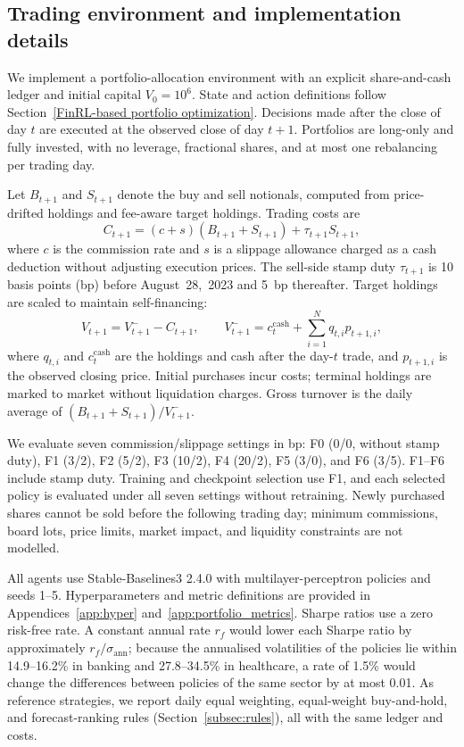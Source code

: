 \subsection{Trading environment and implementation details}
\label{subsec:env}
{\color{blue}
We implement a portfolio-allocation environment with an explicit share-and-cash ledger and initial capital $V_0=10^6$. State and action definitions follow Section~\ref{FinRL-based portfolio optimization}. Decisions made after the close of day $t$ are executed at the observed close of day $t+1$. Portfolios are long-only and fully invested, with no leverage, fractional shares, and at most one rebalancing per trading day.

Let $B_{t+1}$ and $S_{t+1}$ denote the buy and sell notionals, computed from price-drifted holdings and fee-aware target holdings. Trading costs are
\begin{equation}
C_{t+1}=(c+s)(B_{t+1}+S_{t+1})+\tau_{t+1}S_{t+1},
\label{eq:trading_cost}
\end{equation}
where $c$ is the commission rate and $s$ is a slippage allowance charged as a cash deduction without adjusting execution prices. The sell-side stamp duty $\tau_{t+1}$ is 10 basis points (bp) before August~28,~2023 and 5~bp thereafter. Target holdings are scaled to maintain self-financing:
\begin{equation}
V_{t+1}=V^{-}_{t+1}-C_{t+1},
\qquad
V^{-}_{t+1}=c^{\mathrm{cash}}_t+\sum_{i=1}^{N}q_{t,i}p_{t+1,i},
\label{eq:portfolio_value_update}
\end{equation}
where $q_{t,i}$ and $c^{\mathrm{cash}}_t$ are the holdings and cash after the day-$t$ trade, and $p_{t+1,i}$ is the observed closing price. Initial purchases incur costs; terminal holdings are marked to market without liquidation charges. Gross turnover is the daily average of $(B_{t+1}+S_{t+1})/V^{-}_{t+1}$.

We evaluate seven commission/slippage settings in bp: F0 (0/0, without stamp duty), F1 (3/2), F2 (5/2), F3 (10/2), F4 (20/2), F5 (3/0), and F6 (3/5). F1--F6 include stamp duty. Training and checkpoint selection use F1, and each selected policy is evaluated under all seven settings without retraining. Newly purchased shares cannot be sold before the following trading day; minimum commissions, board lots, price limits, market impact, and liquidity constraints are not modelled.

All agents use Stable-Baselines3 2.4.0 with multilayer-perceptron policies and seeds 1--5. Hyperparameters and metric definitions are provided in Appendices~\ref{app:hyper} and~\ref{app:portfolio_metrics}. Sharpe ratios use a zero risk-free rate. A constant annual rate $r_f$ would lower each Sharpe ratio by approximately $r_f/\sigma_{\mathrm{ann}}$; because the annualised volatilities of the policies lie within 14.9--16.2\% in banking and 27.8--34.5\% in healthcare, a rate of 1.5\% would change the differences between policies of the same sector by at most 0.01. As reference strategies, we report daily equal weighting, equal-weight buy-and-hold, and forecast-ranking rules (Section~\ref{subsec:rules}), all with the same ledger and costs.
\par}

